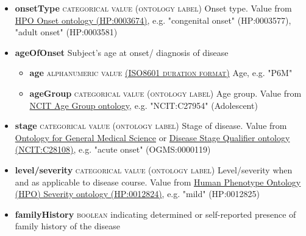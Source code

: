 \documentclass[a4paper, 10pt]{article}        %
\begin{document}
\begin{description}
\begin{itemize}
			\item[] \textbf{onsetType} {\textsc{categorical value (ontology label)}}
 Onset type. Value from \href{http://purl.obolibrary.org/obo/HP_0003674}{HPO Onset ontology (HP:0003674)}, e.g. "congenital onset" (HP:0003577), "adult onset" (HP:0003581)
			\item[]  \textbf{ageOfOnset} Subject's age at onset/ diagnosis of disease
			\begin{itemize}
			\item[] \textbf{age} {\textsc{alphanumeric value \href{https://www.iso.org/iso-8601-date-and-time-format.html}{(ISO8601 duration format)}}} Age, e.g. "P6M"  
			\item[] \textbf{ageGroup} {\textsc{categorical value (ontology label)}} Age group. Value from \href{https://www.ebi.ac.uk/ols/ontologies/ncit/terms?iri=http%3A%2F%2Fpurl.obolibrary.org%2Fobo%2FNCIT_C20587}{NCIT Age Group ontology}, e.g. "NCIT:C27954" (Adolescent)
			\end{itemize}
			\item[]  \textbf{stage} {\textsc{categorical value (ontology label)}} Stage of disease. Value from \href{https://www.ebi.ac.uk/ols/ontologies/ogms}{Ontology for General Medical Science} or \href{https://www.ebi.ac.uk/ols/ontologies/ncit/terms?iri=http%3A%2F%2Fpurl.obolibrary.org%2Fobo%2FNCIT_C28108}{Disease Stage Qualifier ontology (NCIT:C28108)}, e.g. "acute onset" (OGMS:0000119)
			\item[] \textbf{level/severity} {\textsc{categorical value (ontology label)}} Level/severity when and as applicable to disease course. Value from \href{http://purl.obolibrary.org/obo/HP_0012824}{Human Phenotype Ontology (HPO) Severity ontology (HP:0012824)}, e.g. "mild" (HP:0012825)
			\item[] \textbf{familyHistory} {\textsc{boolean}} indicating determined or self-reported presence of family history of the disease
	\end{itemize}


\end{description}
\end{document}
